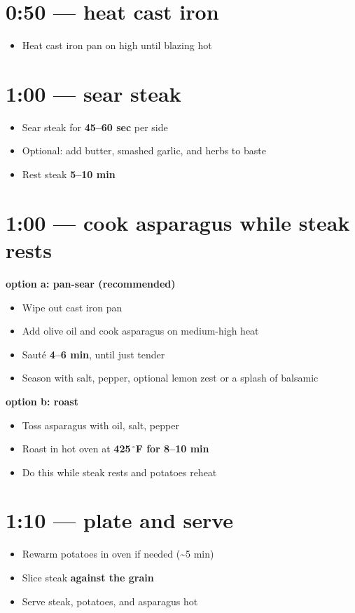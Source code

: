 \documentclass[
    fontsize=10pt,DIV=16,
    letterpaper,oneside,paper=portrait
]{scrartcl}
\newcommand{\sfbf}[1]{\textbf{\sffamily #1}}
\begin{document}
\section{0:50 --- heat cast iron}
\begin{itemize}
  \item Heat cast iron pan on high until blazing hot
\end{itemize}

\section{1:00 --- sear steak}
\begin{itemize}
  \item Sear steak for \textbf{45--60 sec} per side
  \item Optional: add butter, smashed garlic, and herbs to baste
  \item Rest steak \textbf{5--10 min}
\end{itemize}

\section{1:00 --- cook asparagus while steak rests}
\vspace{0.2em}
\sfbf{option a: pan-sear (recommended)}
\begin{itemize}
  \item Wipe out cast iron pan
  \item Add olive oil and cook asparagus on medium-high heat
  \item Sauté \textbf{4--6 min}, until just tender
  \item Season with salt, pepper, optional lemon zest or a splash of balsamic
\end{itemize}

\vspace{0.2em}
\sfbf{option b: roast}
\begin{itemize}
  \item Toss asparagus with oil, salt, pepper
  \item Roast in hot oven at \textbf{425\,$^\circ$F for 8--10 min}
  \item Do this while steak rests and potatoes reheat
\end{itemize}

\section{1:10 --- plate and serve}
\begin{itemize}
  \item Rewarm potatoes in oven if needed (\textasciitilde5 min)
  \item Slice steak \textbf{against the grain}
  \item Serve steak, potatoes, and asparagus hot
\end{itemize}
\end{document}
